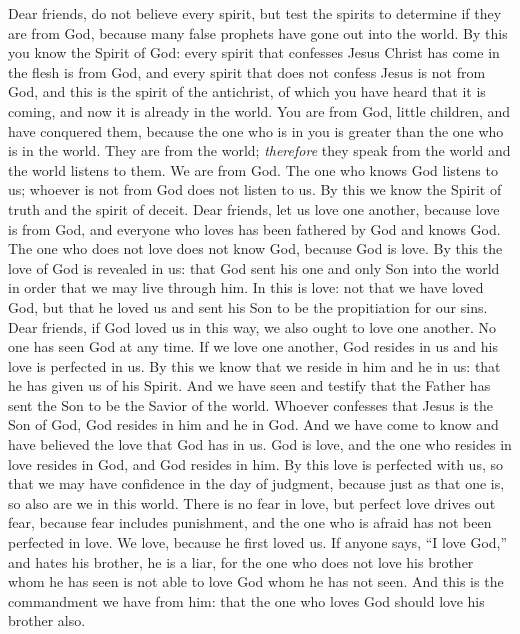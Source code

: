 \begin{biblechapter} %
 Dear friends, do not believe every spirit, but test the spirits to determine if they are from God, because many false prophets have gone out into the world.
\verse By this you know the Spirit of God: every spirit that confesses Jesus Christ has come in the flesh is from God,
\verse and every spirit that does not confess Jesus is not from God, and this is the spirit of the antichrist, of which you have heard that it is coming, and now it is already in the world.
\verse You are from God, little children, and have conquered them, because the one who is in you is greater than the one who is in the world.
\verse They are from the world; \textit{therefore} they speak from the world and the world listens to them.
\verse We are from God. The one who knows God listens to us; whoever is not from God does not listen to us. By this we know the Spirit of truth and the spirit of deceit.
 Dear friends, let us love one another, because love is from God, and everyone who loves has been fathered by God and knows God.
\verse The one who does not love does not know God, because God is love.
\verse By this the love of God is revealed in us: that God sent his one and only Son into the world in order that we may live through him.
\verse In this is love: not that we have loved God, but that he loved us and sent his Son to be the propitiation for our sins.
\verse Dear friends, if God loved us in this way, we also ought to love one another.
\verse No one has seen God at any time. If we love one another, God resides in us and his love is perfected in us.
\verse By this we know that we reside in him and he in us: that he has given us of his Spirit.
\verse And we have seen and testify that the Father has sent the Son to be the Savior of the world.
\verse Whoever confesses that Jesus is the Son of God, God resides in him and he in God.
\verse And we have come to know and have believed the love that God has in us. God is love, and the one who resides in love resides in God, and God resides in him.
\verse By this love is perfected with us, so that we may have confidence in the day of judgment, because just as that one is, so also are we in this world.
\verse There is no fear in love, but perfect love drives out fear, because fear includes punishment, and the one who is afraid has not been perfected in love.
\verse We love, because he first loved us.
\verse If anyone says, “I love God,” and hates his brother, he is a liar, for the one who does not love his brother whom he has seen is not able to love God whom he has not seen.
\verse And this is the commandment we have from him: that the one who loves God should love his brother also.
\end{biblechapter}

